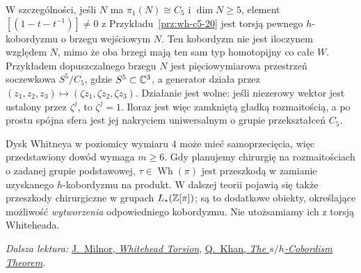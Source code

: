 \begin{uwaga}
W szczególności, jeśli $N$ ma
$\pi_1(N)\cong C_5$ i $\dim N\geq5$, element
$[(1-t-t^{-1})]\ne0$ z
Przykładu~\ref{prz:wh-c5-20} jest torsją
pewnego $h$-kobordyzmu o brzegu wejściowym
$N$. Ten kobordyzm nie jest iloczynem
względem $N$, mimo że oba brzegi mają ten
sam typ homotopijny co całe $W$.
Przykładem dopuszczalnego brzegu $N$ jest pięciowymiarowa
przestrzeń soczewkowa $S^5/C_5$, gdzie
$S^5\subset\mathbb{C}^3$, a generator działa przez
$(z_1,z_2,z_3)\mapsto(\zeta z_1,\zeta z_2,\zeta z_3)$.
Działanie jest wolne: jeśli niezerowy wektor jest ustalony
przez $\zeta^j$, to $\zeta^j=1$.
Iloraz jest więc zamkniętą gładką rozmaitością,
a po prostu spójna sfera jest jej nakryciem uniwersalnym
o grupie przekształceń $C_5$.
\end{uwaga}

\begin{uwaga}
Dysk Whitneya w poziomicy wymiaru $4$ może
mieć samoprzecięcia, więc przedstawiony dowód
wymaga $m\geq6$. Gdy planujemy chirurgię
na rozmaitościach o zadanej grupie podstawowej,
$\tau\in\operatorname{Wh}(\pi)$ jest przeszkodą
w zamianie uzyskanego $h$-kobordyzmu na produkt.
W dalszej teorii pojawią się także przeszkody
chirurgiczne w grupach $L_*(\mathbb{Z}[\pi])$;
są to dodatkowe obiekty, określające możliwość
\emph{wytworzenia} odpowiedniego kobordyzmu.
Nie utożsamiamy ich z torsją Whiteheada.
\end{uwaga}

\par\smallskip
{\footnotesize\noindent\emph{Dalsza lektura:}
\href{https://webhomes.maths.ed.ac.uk/~v1ranick/papers/milnorwh.pdf}
{J.~Milnor, \emph{Whitehead Torsion}},
\href{https://qkhan.pages.iu.edu/research/SLIDES/Lecture02_KHAN.pdf}
{Q.~Khan, \emph{The $s/h$-Cobordism Theorem}}.\par}

\clearpage
